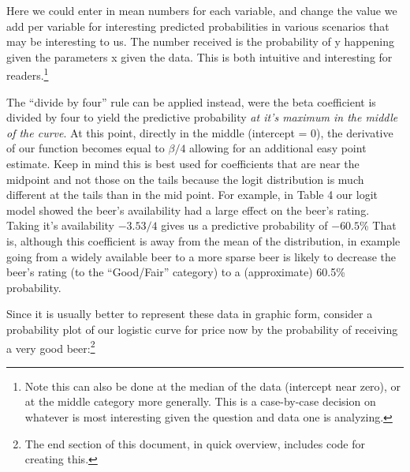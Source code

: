 \documentclass[12pt]{article}\usepackage[]{graphicx}\usepackage[]{color}
\begin{document}
\begin{flushleft}
Here we could enter in mean numbers for each variable, and change the value we add per variable for interesting predicted probabilities in various scenarios that may be interesting to us. The number received is the probability of y happening given the parameters x given the data. This is both intuitive and interesting for readers.\footnote{Note this can also be done at the median of the data (intercept near zero), or at the middle category more generally. This is a case-by-case decision on whatever is most interesting given the question and data one is analyzing.}

The ``divide by four'' rule can be applied instead, were the beta coefficient is divided by four to yield the predictive probability \textit{at it's maximum in the middle of the curve}. At this point, directly in the middle (intercept = 0), the derivative of our function becomes equal to $\beta / 4$ allowing for an additional easy point estimate. Keep in mind this is best used for coefficients that are near the midpoint and not those on the tails because the logit distribution is much different at the tails than in the mid point. For example, in Table 4 our logit model showed the beer's availability had a large effect on the beer's rating. Taking it's availability $-3.53/4$ gives us a predictive probability of $-60.5$\%  That is, although this coefficient is away from the mean of the distribution, in example going from a widely available beer to a more sparse beer is likely to decrease the beer's rating (to the ``Good/Fair'' category) to a (approximate) 60.5\% probability.

Since it is usually better to represent these data in graphic form, consider a probability plot of our logistic curve for price now by the probability of receiving a very good beer:\footnote{The end section of this document, in quick overview, includes code for creating this.}



\end{flushleft}
\end{document}
